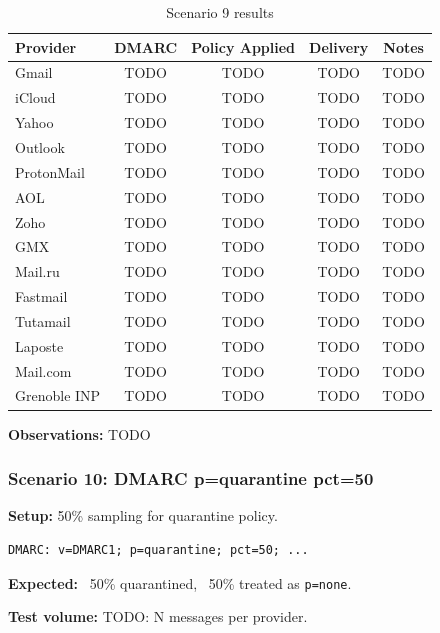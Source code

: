 \documentclass[11pt,a4paper]{article}
\begin{document}
\begin{table}[h]
\centering
\small
\begin{tabular}{lcccc}
\toprule
\textbf{Provider} & \textbf{DMARC} & \textbf{Policy Applied} & \textbf{Delivery} & \textbf{Notes} \\
\midrule
Gmail & TODO & TODO & TODO & TODO \\
iCloud & TODO & TODO & TODO & TODO \\
Yahoo & TODO & TODO & TODO & TODO \\
Outlook & TODO & TODO & TODO & TODO \\
ProtonMail & TODO & TODO & TODO & TODO \\
AOL & TODO & TODO & TODO & TODO \\
Zoho & TODO & TODO & TODO & TODO \\
GMX & TODO & TODO & TODO & TODO \\
Mail.ru & TODO & TODO & TODO & TODO \\
Fastmail & TODO & TODO & TODO & TODO \\
Tutamail & TODO & TODO & TODO & TODO \\
Laposte & TODO & TODO & TODO & TODO \\
Mail.com & TODO & TODO & TODO & TODO \\
Grenoble INP & TODO & TODO & TODO & TODO \\
\bottomrule
\end{tabular}
\caption{Scenario 9 results}
\end{table}

\textbf{Observations:} TODO


\subsubsection{Scenario 10: DMARC p=quarantine pct=50}

\textbf{Setup:} 50\% sampling for quarantine policy.

\begin{lstlisting}
DMARC: v=DMARC1; p=quarantine; pct=50; ...
\end{lstlisting}

\textbf{Expected:} ~50\% quarantined, ~50\% treated as \texttt{p=none}.

\textbf{Test volume:} TODO: N messages per provider.
\end{document}
